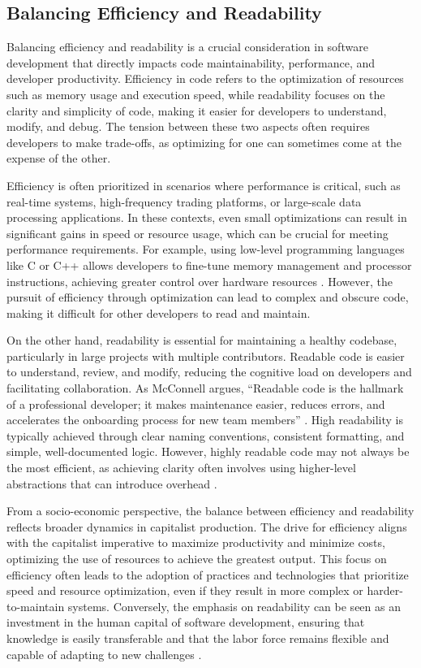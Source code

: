 \begin{refsection}
\subsection{Balancing Efficiency and Readability}

Balancing efficiency and readability is a crucial consideration in software development that directly impacts code maintainability, performance, and developer productivity. Efficiency in code refers to the optimization of resources such as memory usage and execution speed, while readability focuses on the clarity and simplicity of code, making it easier for developers to understand, modify, and debug. The tension between these two aspects often requires developers to make trade-offs, as optimizing for one can sometimes come at the expense of the other.

Efficiency is often prioritized in scenarios where performance is critical, such as real-time systems, high-frequency trading platforms, or large-scale data processing applications. In these contexts, even small optimizations can result in significant gains in speed or resource usage, which can be crucial for meeting performance requirements. For example, using low-level programming languages like C or C++ allows developers to fine-tune memory management and processor instructions, achieving greater control over hardware resources \cite[pp.~78-81]{Pressman2019}. However, the pursuit of efficiency through optimization can lead to complex and obscure code, making it difficult for other developers to read and maintain.

On the other hand, readability is essential for maintaining a healthy codebase, particularly in large projects with multiple contributors. Readable code is easier to understand, review, and modify, reducing the cognitive load on developers and facilitating collaboration. As McConnell argues, “Readable code is the hallmark of a professional developer; it makes maintenance easier, reduces errors, and accelerates the onboarding process for new team members” \cite[pp.~130-132]{McConnell2004}. High readability is typically achieved through clear naming conventions, consistent formatting, and simple, well-documented logic. However, highly readable code may not always be the most efficient, as achieving clarity often involves using higher-level abstractions that can introduce overhead \cite[pp.~102-105]{Martin2022}.

From a socio-economic perspective, the balance between efficiency and readability reflects broader dynamics in capitalist production. The drive for efficiency aligns with the capitalist imperative to maximize productivity and minimize costs, optimizing the use of resources to achieve the greatest output. This focus on efficiency often leads to the adoption of practices and technologies that prioritize speed and resource optimization, even if they result in more complex or harder-to-maintain systems. Conversely, the emphasis on readability can be seen as an investment in the human capital of software development, ensuring that knowledge is easily transferable and that the labor force remains flexible and capable of adapting to new challenges \cite[pp.~304-306]{Sommerville2016}.


\end{refsection}
